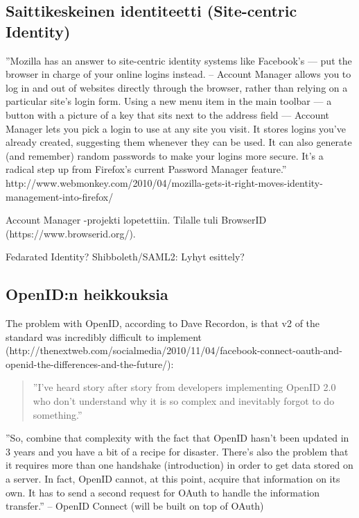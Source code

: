 \documentclass[english,gradu]{tktltiki}
\begin{document}
\subsection{Saittikeskeinen identiteetti (Site-centric Identity)} %
\label{sub:saittikeskeinen_identiteetti_site_centric_identity_}
''Mozilla has an answer to site-centric identity systems like Facebook’s — put the browser in charge of your online logins instead. -- Account Manager allows you to log in and out of websites directly through the browser, rather than relying on a particular site’s login form. Using a new menu item in the main toolbar — a button with a picture of a key that sits next to the address field — Account Manager lets you pick a login to use at any site you visit. It stores logins you’ve already created, suggesting them whenever they can be used. It can also generate (and remember) random passwords to make your logins more secure. It’s a radical step up from Firefox’s current Password Manager feature.''
http://www.webmonkey.com/2010/04/mozilla-gets-it-right-moves-identity-management-into-firefox/

Account Manager -projekti lopetettiin. Tilalle tuli BrowserID (https://www.browserid.org/).

Fedarated Identity? Shibboleth/SAML2: Lyhyt esittely?


\subsection{OpenID:n heikkouksia} %
\label{sub:openid_n_heikkouksia}

The problem with OpenID, according to Dave Recordon, is that v2 of the standard was incredibly difficult to implement (http://thenextweb.com/socialmedia/2010/11/04/facebook-connect-oauth-and-openid-the-differences-and-the-future/):
\begin{quote}
  ''I’ve heard story after story from developers implementing OpenID 2.0 who don’t understand why it is so complex and inevitably forgot to do something.''
\end{quote}

''So, combine that complexity with the fact that OpenID hasn’t been updated in 3 years and you have a bit of a recipe for disaster. There’s also the problem that it requires more than one handshake (introduction) in order to get data stored on a server. In fact, OpenID cannot, at this point, acquire that information on its own. It has to send a second request for OAuth to handle the information transfer.'' -- OpenID Connect (will be built on top of OAuth)
\end{document}
